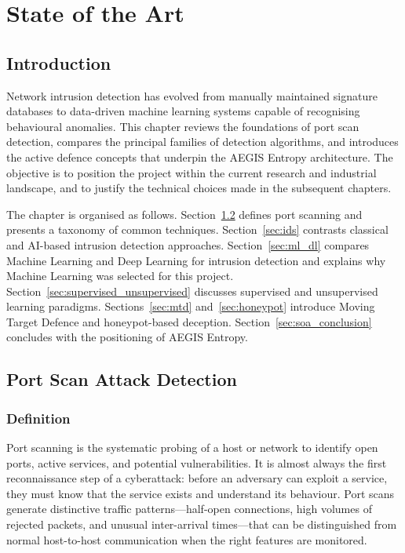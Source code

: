 
\chapter{State of the Art}\label{ch:state_of_art}

\section{Introduction}

Network intrusion detection has evolved from manually maintained signature databases to data-driven machine learning systems capable of recognising behavioural anomalies. This chapter reviews the foundations of port scan detection, compares the principal families of detection algorithms, and introduces the active defence concepts that underpin the AEGIS Entropy architecture. The objective is to position the project within the current research and industrial landscape, and to justify the technical choices made in the subsequent chapters.

The chapter is organised as follows. Section~\ref{sec:portscan} defines port scanning and presents a taxonomy of common techniques. Section~\ref{sec:ids} contrasts classical and AI-based intrusion detection approaches. Section~\ref{sec:ml_dl} compares Machine Learning and Deep Learning for intrusion detection and explains why Machine Learning was selected for this project. Section~\ref{sec:supervised_unsupervised} discusses supervised and unsupervised learning paradigms. Sections~\ref{sec:mtd} and~\ref{sec:honeypot} introduce Moving Target Defence and honeypot-based deception. Section~\ref{sec:soa_conclusion} concludes with the positioning of AEGIS Entropy.

\section{Port Scan Attack Detection}\label{sec:portscan}

\subsection{Definition}

Port scanning is the systematic probing of a host or network to identify open ports, active services, and potential vulnerabilities. It is almost always the first reconnaissance step of a cyberattack: before an adversary can exploit a service, they must know that the service exists and understand its behaviour. Port scans generate distinctive traffic patterns---half-open connections, high volumes of rejected packets, and unusual inter-arrival times---that can be distinguished from normal host-to-host communication when the right features are monitored.

